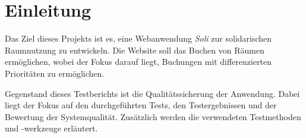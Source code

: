 
\chapter{Einleitung}
\label{ch:preface}

Das Ziel dieses Projekts ist es, eine Webanwendung \textit{Soli} zur solidarischen Raumnutzung zu entwickeln.
Die Website soll das Buchen von Räumen ermöglichen, wobei der Fokus darauf liegt, Buchungen mit differenzierten Prioritäten zu ermöglichen.

Gegenstand dieses Testberichts ist die Qualitätssicherung der Anwendung.
Dabei liegt der Fokus auf den durchgeführten Tests, den Testergebnissen und der Bewertung der Systemqualität.
Zusätzlich werden die verwendeten Testmethoden und -werkzeuge erläutert.